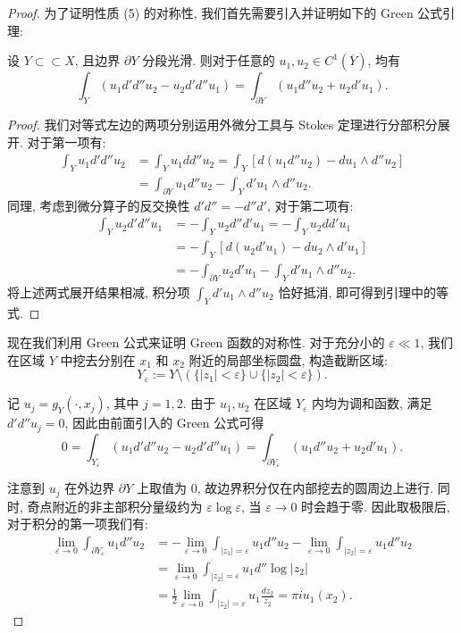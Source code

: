 \begin{proof}
为了证明性质 (5) 的对称性, 我们首先需要引入并证明如下的 Green 公式引理:

\begin{lemma}[Green 公式]
设 $Y \subset\subset X$, 且边界 $\partial Y$ 分段光滑. 则对于任意的 $u_1, u_2 \in C^1(\overline{Y})$, 均有
\[ \int_Y (u_1 d'd''u_2 - u_2 d'd''u_1) = \int_{\partial Y} (u_1 d''u_2 + u_2 d'u_1). \]
\end{lemma}

\begin{proof}
我们对等式左边的两项分别运用外微分工具与 Stokes 定理进行分部积分展开. 对于第一项有:
\begin{align*}
\int_Y u_1 d'd''u_2 &= \int_Y u_1 d d''u_2 = \int_Y \left[ d(u_1 d''u_2) - du_1 \wedge d''u_2 \right] \\
&= \int_{\partial Y} u_1 d''u_2 - \int_Y d'u_1 \wedge d''u_2.
\end{align*}
同理, 考虑到微分算子的反交换性 $d'd'' = -d''d'$, 对于第二项有:
\begin{align*}
\int_Y u_2 d'd''u_1 &= -\int_Y u_2 d''d'u_1 = -\int_Y u_2 d d'u_1 \\
&= -\int_Y \left[ d(u_2 d'u_1) - du_2 \wedge d'u_1 \right] \\
&= -\int_{\partial Y} u_2 d'u_1 - \int_Y d'u_1 \wedge d''u_2.
\end{align*}
将上述两式展开结果相减, 积分项 $\int_Y d'u_1 \wedge d''u_2$ 恰好抵消, 即可得到引理中的等式.
\end{proof}

现在我们利用 Green 公式来证明 Green 函数的对称性. 对于充分小的 $\varepsilon \ll 1$, 我们在区域 $Y$ 中挖去分别在 $x_1$ 和 $x_2$ 附近的局部坐标圆盘, 构造截断区域:
\[ Y_\varepsilon := Y \setminus (\{|z_1| < \varepsilon\} \cup \{|z_2| < \varepsilon\}). \]

记 $u_j = g_Y(\cdot, x_j)$, 其中 $j=1, 2$. 由于 $u_1, u_2$ 在区域 $Y_\varepsilon$ 内均为调和函数, 满足 $d'd'' u_j = 0$, 因此由前面引入的 Green 公式可得
\[ 0 = \int_{Y_\varepsilon} (u_1 d'd''u_2 - u_2 d'd''u_1) = \int_{\partial Y_\varepsilon} (u_1 d''u_2 + u_2 d'u_1). \]

注意到 $u_j$ 在外边界 $\partial Y$ 上取值为 $0$, 故边界积分仅在内部挖去的圆周边上进行. 同时, 奇点附近的非主部积分量级约为 $\varepsilon \log \varepsilon$, 当 $\varepsilon \to 0$ 时会趋于零. 因此取极限后, 对于积分的第一项我们有:
\begin{align*}
\lim_{\varepsilon \to 0} \int_{\partial Y_\varepsilon} u_1 d''u_2 &= -\lim_{\varepsilon \to 0} \int_{|z_1|=\varepsilon} u_1 d''u_2 - \lim_{\varepsilon \to 0} \int_{|z_2|=\varepsilon} u_1 d''u_2 \\
&= \lim_{\varepsilon \to 0} \int_{|z_2|=\varepsilon} u_1 d'' \log|z_2| \\
&= \frac{1}{2} \lim_{\varepsilon \to 0} \int_{|z_2|=\varepsilon} u_1 \frac{dz_2}{z_2} = \pi i u_1(x_2).
\end{align*}


\end{proof}
